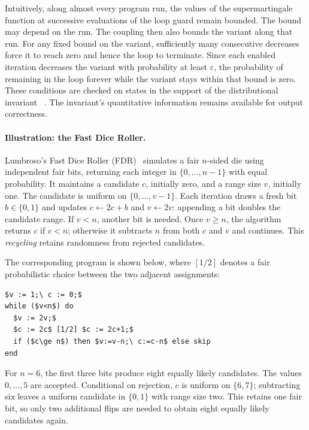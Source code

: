 Intuitively, along almost every program run, the values of the
supermartingale function at successive evaluations of the loop guard
remain bounded. The bound may depend on the run.
The coupling then also bounds the variant along that run.
For any fixed bound on the variant, sufficiently many consecutive
decreases force it to reach zero and hence the loop to terminate.
Since each enabled iteration decreases the variant with probability
at least $\varepsilon$, the probability of remaining in the loop
forever while the variant stays within that bound is zero. These conditions are checked on states in the support of the
distributional invariant%
~\cite{zilken2026verifyingsamplingalgorithmsdistributional}.
The invariant's quantitative information remains available for
output correctness.

\paragraph{Illustration: the Fast Dice Roller.}
Lumbroso's Fast Dice Roller
(FDR)~\cite{DBLP:journals/corr/abs-1304-1916} simulates a fair $n$-sided
die using independent fair bits, returning each integer in
$\{0,\ldots,n-1\}$ with equal probability.
It maintains a candidate $c$, initially zero, and a range size $v$,
initially one. The candidate is uniform on $\{0,\ldots,v-1\}$.
Each iteration draws a fresh bit $b\in\{0,1\}$ and updates
$c\gets2c+b$ and $v\gets2v$: appending a bit doubles the candidate range.
If $v<n$, another bit is needed. Once $v\geq n$, the algorithm returns
$c$ if $c<n$; otherwise it subtracts $n$ from both $c$ and $v$ and
continues. This \emph{recycling} retains randomness from rejected candidates.

The corresponding program is shown below, where $[1/2]$ denotes a fair
probabilistic choice between the two adjacent assignments:
\begin{lstlisting}[basicstyle=\ttfamily\small,mathescape=true,frame=single]
$v := 1;\ c := 0;$
while ($v<n$) do
  $v := 2v;$
  $c := 2c$ [1/2] $c := 2c+1;$
  if ($c\ge n$) then $v:=v-n;\ c:=c-n$ else skip
end
\end{lstlisting}

For $n=6$, the first three bits produce eight equally likely candidates.
The values $0,\ldots,5$ are accepted. Conditional on rejection, $c$ is
uniform on $\{6,7\}$; subtracting six leaves a uniform candidate in
$\{0,1\}$ with range size two. This retains one fair bit, so only two
additional flips are needed to obtain eight equally likely candidates again.

